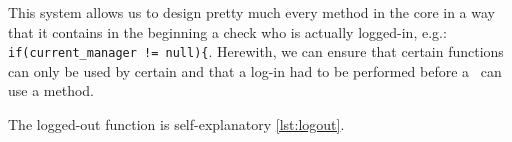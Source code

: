 This system allows us to design pretty much every method in the core in a way that it contains in the beginning a check who is actually logged-in, e.g.: \lstinline|if(current_manager != null){|. Herewith, we can ensure that certain functions can only be used by certain \User and that a log-in had to be performed before a \User~can use a method.

The logged-out function is self-explanatory \ref{lst:logout}.












